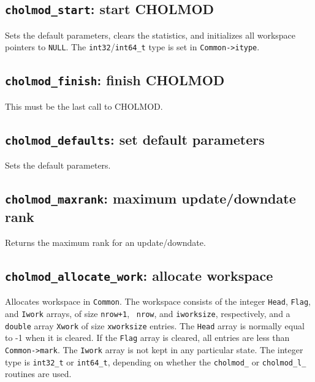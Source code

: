\documentclass[11pt]{article}
\begin{document}
\subsection{{\tt cholmod\_start}: start CHOLMOD}


Sets the default parameters, clears the statistics, and initializes all
workspace pointers to {\tt NULL}.  The {\tt int32}/{\tt int64\_t} type
is set in {\tt Common->itype}.

\subsection{{\tt cholmod\_finish}: finish CHOLMOD}


This must be the last call to CHOLMOD.

\subsection{{\tt cholmod\_defaults}: set default parameters}


Sets the default parameters.

\subsection{{\tt cholmod\_maxrank}: maximum update/downdate rank}


Returns the maximum rank for an update/downdate.

\subsection{{\tt cholmod\_allocate\_work}: allocate workspace}


Allocates workspace in {\tt Common}.  The workspace consists of the integer
{\tt Head}, {\tt Flag}, and {\tt Iwork} arrays, of size {\tt nrow+1}, {\tt
nrow}, and {\tt iworksize}, respectively, and a {\tt double} array {\tt Xwork}
of size {\tt xworksize} entries.  The {\tt Head} array is normally equal to -1
when it is cleared.  If the {\tt Flag} array is cleared, all entries are less
than {\tt Common->mark}.  The {\tt Iwork} array is not kept in any particular
state.  The integer type is {\tt int32\_t} or {\tt int64\_t}, depending on
whether the {\tt cholmod\_} or {\tt cholmod\_l\_} routines are used.
\end{document}
